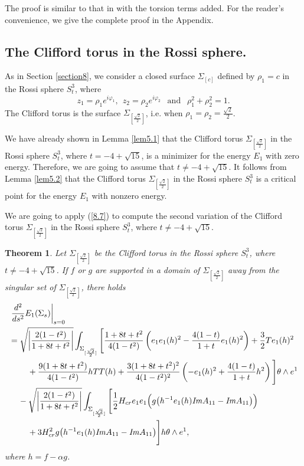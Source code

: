 \documentclass{amsart}
\newtheorem{theorem}{Theorem}[section]
\theoremstyle{Corollary}
\numberwithin{equation}{section}
\begin{document}
The proof is similar to that in \cite[Lemma 5.5]{CCYZ} 
with the torsion terms added. For the reader's convenience, we give the complete proof in the Appendix.



\subsection{The Clifford torus in the Rossi sphere.}
As in Section \ref{section8}, 
 we consider 
a closed surface $\Sigma_{[c]}$ defined by 
$\rho_1=c$ in the Rossi sphere $S^3_t$,
where 
$$z_1=\rho_1 e^{i\varphi_1},~~ z_2=\rho_2 e^{i\varphi_2}~~\mbox{ and }~~
\rho_1^2+\rho_2^2=1.$$
The Clifford torus is the surface $\Sigma_{[\frac{\sqrt{2}}{2}]}$, i.e. 
when $\rho_1=\rho_2=\frac{\sqrt{2}}{2}$. 


We have already shown in Lemma \ref{lem5.1} that 
the Clifford torus
 $\Sigma_{[\frac{\sqrt{2}}{2}]}$ 
in the Rossi sphere $S^3_{t}$, where 
$t=-4+\sqrt{15}$, 
is a minimizer for the energy $E_1$ 
 with zero energy.    
Therefore, we are going to assume that $t\neq -4+\sqrt{15}$. 
It follows from Lemma \ref{lem5.2}
that the Clifford torus
 $\Sigma_{[\frac{\sqrt{2}}{2}]}$ 
in the Rossi sphere $S^3_{t}$
is a critical point for the energy $E_1$ with nonzero energy.


We are going to apply (\ref{8.7}) to compute the second variation 
of the Clifford torus $\Sigma_{[\frac{\sqrt{2}}{2}]}$ 
in the Rossi sphere $S^3_{t}$, where $t\neq -4+\sqrt{15}$. 
 


  
\begin{theorem}\label{thm8.1}
Let $\Sigma_{[\frac{\sqrt{2}}{2}]}$ be the Clifford torus 
in the Rossi sphere $S^3_{t}$, where $t\neq -4+\sqrt{15}$.
If $f$ or $g$ are supported in a domain of $\Sigma_{[\frac{\sqrt{2}}{2}]}$
away from the singular set of  $\Sigma_{[\frac{\sqrt{2}}{2}]}$, there holds 
\begin{equation}\label{8.18}
\begin{split}
&\left.\frac{d^2}{ds^2}E_1(\Sigma_s)\right|_{s=0}\\ &=
\sqrt{\left|\frac{2(1-t^2)}{1+8t+t^2}\right|}\int_{\Sigma_{[\frac{\sqrt{2}}{2}]}}
\Bigg[\frac{1+8t+t^2}{4(1-t^2)}\left(e_1e_1(h)^2-\frac{4(1-t)}{1+t}e_1(h)^2\right)
+\frac{3}{2}Te_1(h)^2\\
&\hspace{8mm}+\frac{9(1+8t+t^2)}{4(1-t^2)}hTT(h)
+\frac{3(1+8t+t^2)^2}{4(1-t^2)^2}\left(-e_1(h)^2+\frac{4(1-t)}{1+t}h^2\right)
\Bigg]\theta\wedge e^1\\
&\hspace{4mm}-\sqrt{\left|\frac{2(1-t^2)}{1+8t+t^2}\right|} \int_{\Sigma_{[\frac{\sqrt{2}}{2}]}}
\Bigg[\frac{1}{2}H_{cr}e_1e_1\Big(g\big(h^{-1}e_1(h)\mbox{\emph{Im}}A_{11}-\mbox{\emph{Im}}A_{11}\big)\Big)\\
&\hspace{8mm}
+3H_{cr}^2g\big(h^{-1}e_1(h)\mbox{\emph{Im}}A_{11}-\mbox{\emph{Im}}A_{11}\big)\Bigg]h\theta\wedge e^1,
\end{split}
\end{equation}
where $h=f-\alpha g$. 
\end{theorem}
\end{document}
